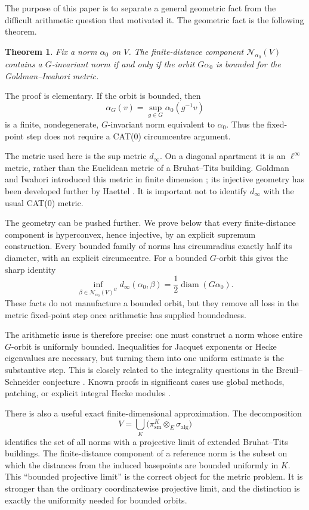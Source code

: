 \documentclass[12pt]{article}
\newtheorem{theorem}{Theorem}[section]
\theoremstyle{definition}
\theoremstyle{remark}
\newcommand{\Norm}{\mathscr N}
\newcommand{\dinf}{d_{\infty}}
\begin{document}
The purpose of this paper is to separate a general geometric fact from
the difficult arithmetic question that motivated it.  The geometric
fact is the following theorem.

\begin{theorem}\label{thm:intro}
Fix a norm $\alpha_0$ on $V$.  The finite-distance component
$\Norm_{\alpha_0}(V)$ contains a $G$-invariant norm if and only if the
orbit $G\alpha_0$ is bounded for the Goldman--Iwahori metric.
\end{theorem}

The proof is elementary.  If the orbit is bounded, then
\[
  \alpha_G(v)=\sup_{g\in G}\alpha_0(g^{-1}v)
\]
is a finite, nondegenerate, $G$-invariant norm equivalent to
$\alpha_0$.  Thus the fixed-point step does not require a CAT(0)
circumcentre argument.

The metric used here is the sup metric $\dinf$.  On a diagonal apartment
it is an $\ell^\infty$ metric, rather than the Euclidean metric of a
Bruhat--Tits building.  Goldman and Iwahori introduced this metric in
finite dimension \cite{MR144889}; its injective geometry has been
developed further by Haettel \cite{Haettel2022}.  It is important not to
identify $\dinf$ with the usual CAT(0) metric.


The geometry can be pushed further.  We prove below that every finite-distance
component is hyperconvex, hence injective, by an explicit supremum
construction.  Every bounded family of norms has circumradius exactly half
its diameter, with an explicit circumcentre.  For a bounded \(G\)-orbit this
gives the sharp identity
\[
 \inf_{\beta\in\Norm_{\alpha_0}(V)^G}
 \dinf(\alpha_0,\beta)
 =
 \frac12
 \operatorname{diam}(G\alpha_0).
\]
These facts do not manufacture a bounded orbit, but they remove all loss in
the metric fixed-point step once arithmetic has supplied boundedness.

The arithmetic issue is therefore precise: one must construct a norm
whose entire $G$-orbit is uniformly bounded.  Inequalities for Jacquet
exponents or Hecke eigenvalues are necessary, but turning them into one
uniform estimate is the substantive step.  This is closely related to
the integrality questions in the Breuil--Schneider conjecture
\cite{MR2359853,MR3409331}.  Known proofs in significant cases use
global methods, patching, or explicit integral Hecke modules
\cite{Sorensen2013,CEGGPS2016,Pyvovarov2021}.

There is also a useful exact finite-dimensional approximation.  The
decomposition
\[
  V=\bigcup_K\bigl(\pi_{\mathrm{sm}}^K\otimes_E\sigma_{\mathrm{alg}}\bigr)
\]
identifies the set of all norms with a projective limit of extended
Bruhat--Tits buildings.  The finite-distance component of a reference
norm is the subset on which the distances from the induced basepoints
are bounded uniformly in $K$.  This ``bounded projective limit'' is the
correct object for the metric problem.  It is stronger than the ordinary
coordinatewise projective limit, and the distinction is exactly the
uniformity needed for bounded orbits.
\end{document}
